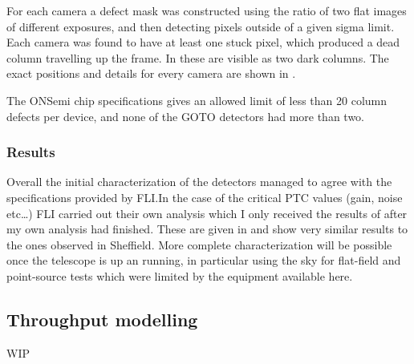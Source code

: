 \begin{colsection}
\begin{colsection}
For each camera a defect mask was constructed using the ratio of two flat images of different exposures, and then detecting pixels outside of a given sigma limit. Each camera was found to have at least one stuck pixel, which produced a dead column travelling up the frame. In  these are visible as two dark columns. The exact positions and details for every camera are shown in .

The ONSemi chip specifications gives an allowed limit of less than 20 column defects per device, and none of the GOTO detectors had more than two.

\newpage
\subsubsection{Results}

Overall the initial characterization of the detectors managed to agree with the specifications provided by FLI.\@ In the case of the critical PTC values (gain, noise etc\ldots) FLI carried out their own analysis which I only received the results of after my own analysis had finished. These are given in  and show very similar results to the ones observed in Sheffield. More complete characterization will be possible once the telescope is up an running, in particular using the sky for flat-field and point-source tests which were limited by the equipment available here.

\end{colsection}

\newpage
\subsection{Throughput modelling}
\label{sec:throughput}
\begin{colsection}

WIP

\end{colsection}


\end{colsection}


\newpage
